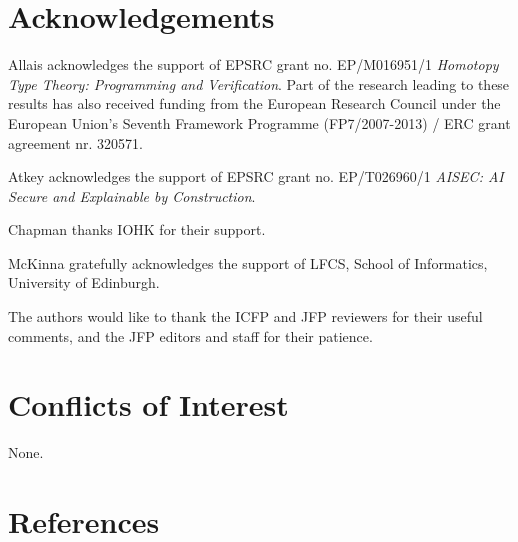 \documentclass{jfp}
\begin{document}
\maketitle




\section*{Acknowledgements}

Allais acknowledges the support of EPSRC grant no. EP/M016951/1
\emph{Homotopy Type Theory: Programming and Verification}.
Part of the research leading to these results has also received funding from
the European Research Council under the European Union’s Seventh Framework
Programme (FP7/2007-2013) / ERC grant agreement nr. 320571.

Atkey acknowledges the support of EPSRC grant no. EP/T026960/1
\emph{AISEC: AI Secure and Explainable by Construction}.

Chapman thanks IOHK for their support. 

McKinna gratefully acknowledges the support of LFCS, School of
Informatics, University of Edinburgh.

The authors would like to thank the ICFP and JFP reviewers for their
useful comments, and the JFP editors and staff for their patience.

\section*{Conflicts of Interest}

None.


\renewcommand{\bibsection}{}
\section*{References}



\label{lastpage01}
\end{document}
